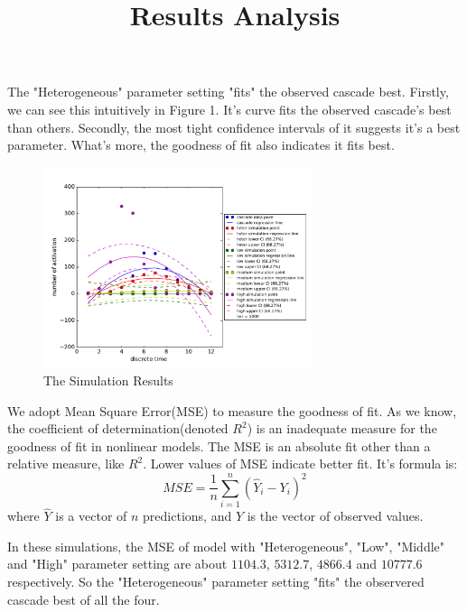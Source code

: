 \documentclass[10pt,a4paper]{article}
\title{Results Analysis}
\date{\vspace{-5ex}}
\begin{document}
\maketitle

The "Heterogeneous" parameter setting "fits" the observed cascade best. Firstly, we can see this intuitively in Figure 1. It's curve fits the observed cascade's best than others. Secondly, the most tight confidence intervals of it suggests it's a best parameter. What's more, the goodness of fit also indicates it fits best.

\begin{figure}[h]
    \centering
    \includegraphics[width=0.7\textwidth, height=0.3\textheight]{simulate}
    \caption{The Simulation Results}
    \label{fig:simulate}
\end{figure}

We adopt Mean Square Error(MSE) to measure the goodness of fit. As we know, the coefficient of determination(denoted \(R^2\)) is an inadequate measure for the goodness of fit in nonlinear models. The MSE is an absolute fit other than a relative measure, like \(R^2\). Lower values of MSE indicate better fit. It's formula is:
\begin{equation}
    MSE=\frac{1}{n}\sum_{i=1}^{n}(\hat{Y}_{i}-Y_{i})^{2}
\end{equation}
where \(\hat{Y}\) is a vector of \(n\) predictions, and \(Y\) is the vector of observed values. 

In these simulations, the MSE of model with "Heterogeneous", "Low", "Middle" and "High" parameter setting are about \(1104.3\), \(5312.7\), \(4866.4\) and \(10777.6\) respectively. So the "Heterogeneous" parameter setting "fits" the observered cascade best of all the four.
\end{document}
